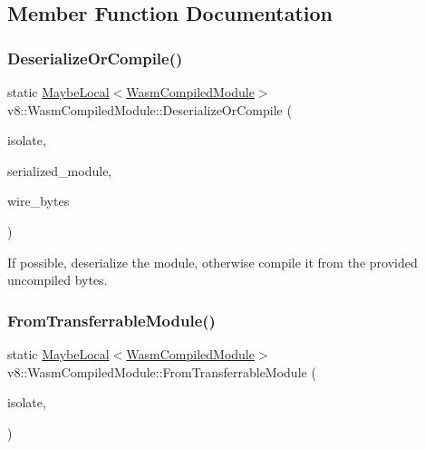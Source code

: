 \subsection{Member Function Documentation}
\mbox{\label{classv8_1_1WasmCompiledModule_abd5b90ef1d021e148c2fcb052a8651d4}} 
\subsubsection{\texorpdfstring{Deserialize\+Or\+Compile()}{DeserializeOrCompile()}}
{\footnotesize\ttfamily static \mbox{\hyperlink{classv8_1_1MaybeLocal}{Maybe\+Local}}$<$\mbox{\hyperlink{classv8_1_1WasmCompiledModule}{Wasm\+Compiled\+Module}}$>$ v8\+::\+Wasm\+Compiled\+Module\+::\+Deserialize\+Or\+Compile (\begin{DoxyParamCaption}\item[{Isolate $\ast$}]{isolate,  }\item[{\mbox{\hyperlink{structv8_1_1WasmCompiledModule_1_1BufferReference}{Buffer\+Reference}}}]{serialized\+\_\+module,  }\item[{\mbox{\hyperlink{structv8_1_1WasmCompiledModule_1_1BufferReference}{Buffer\+Reference}}}]{wire\+\_\+bytes }\end{DoxyParamCaption})\hspace{0.3cm}{\ttfamily [static]}}

If possible, deserialize the module, otherwise compile it from the provided uncompiled bytes. \mbox{\label{classv8_1_1WasmCompiledModule_a6bdfdf09e75ad1eb19d5b944e6177f74}} 
\subsubsection{\texorpdfstring{From\+Transferrable\+Module()}{FromTransferrableModule()}}
{\footnotesize\ttfamily static \mbox{\hyperlink{classv8_1_1MaybeLocal}{Maybe\+Local}}$<$\mbox{\hyperlink{classv8_1_1WasmCompiledModule}{Wasm\+Compiled\+Module}}$>$ v8\+::\+Wasm\+Compiled\+Module\+::\+From\+Transferrable\+Module (\begin{DoxyParamCaption}\item[{Isolate $\ast$}]{isolate,  }\item[{const \mbox{\hyperlink{classv8_1_1WasmCompiledModule_1_1TransferrableModule}{Transferrable\+Module}} \&}]{ }\end{DoxyParamCaption})\hspace{0.3cm}{\ttfamily [static]}}

